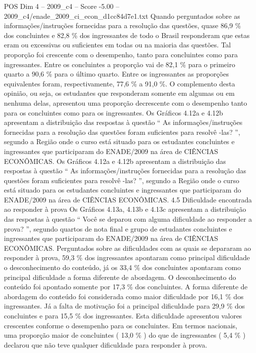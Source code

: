 \begin{textsample}{POS Dim 4 – 2009\_c4 – Score -5.00 – 2009\_c4/enade\_2009\_ci\_econ\_d1cc84d7e1.txt}
Quando perguntados sobre as informações/instruções fornecidas para a resolução das questões, quase 86,9 \% dos concluintes e 82,8 \% dos ingressantes de todo o Brasil responderam que estas eram ou excessivas ou suficientes em todas ou na maioria das questões.
Tal proporção foi crescente com o desempenho, tanto para concluintes como para ingressantes.
Entre os concluintes a proporção vai de 82,1 \% para o primeiro quarto a 90,6 \% para o último quarto.
Entre os ingressantes as proporções equivalentes foram, respectivamente, 77,6 \% a 91,0 \%.
O complemento desta opinião, ou seja, os estudantes que responderam somente em algumas ou em nenhuma delas, apresentou uma proporção decrescente com o desempenho tanto para os concluintes como para os ingressantes.
Os Gráficos 4.12a e 4.12b apresentam a distribuição das respostas à questão “ As informações/instruções fornecidas para a resolução das questões foram suficientes para resolvê -las? ”, segundo a Região onde o curso está situado para os estudantes concluintes e ingressantes que participaram do ENADE/2009 na área de CIÊNCIAS ECONÔMICAS.
Os Gráficos 4.12a e 4.12b apresentam a distribuição das respostas à questão “ As informações/instruções fornecidas para a resolução das questões foram suficientes para resolvê -las? ”, segundo a Região onde o curso está situado para os estudantes concluintes e ingressantes que participaram do ENADE/2009 na área de CIÊNCIAS ECONÔMICAS. 4.5 Dificuldade encontrada ao responder à prova Os Gráficos 4.13a, 4.13b e 4.13c apresentam a distribuição das respostas à questão “ Você se deparou com alguma dificuldade ao responder a prova? ”, segundo quartos de nota final e grupo de estudantes concluintes e ingressantes que participaram do ENADE/2009 na área de CIÊNCIAS ECONÔMICAS.
Perguntados sobre as dificuldades com as quais se depararam ao responder à prova, 59,3 \% dos ingressantes apontaram como principal dificuldade o desconhecimento do conteúdo, já os 33,4 \% dos concluintes apontaram como principal dificuldade a forma diferente de abordagem.
O desconhecimento do conteúdo foi apontado somente por 17,3 \% dos concluintes.
A forma diferente de abordagem do conteúdo foi considerada como maior dificuldade por 16,1 \% dos ingressantes.
Já a falta de motivação foi a principal dificuldade para 29,9 \% dos concluintes e para 15,5 \% dos ingressantes.
Esta dificuldade apresentou valores crescentes conforme o desempenho para os concluintes.
Em termos nacionais, uma proporção maior de concluintes ( 13,0 \% ) do que de ingressantes ( 5,4 \% ) declarou que não teve qualquer dificuldade para responder à prova.

\end{textsample}

